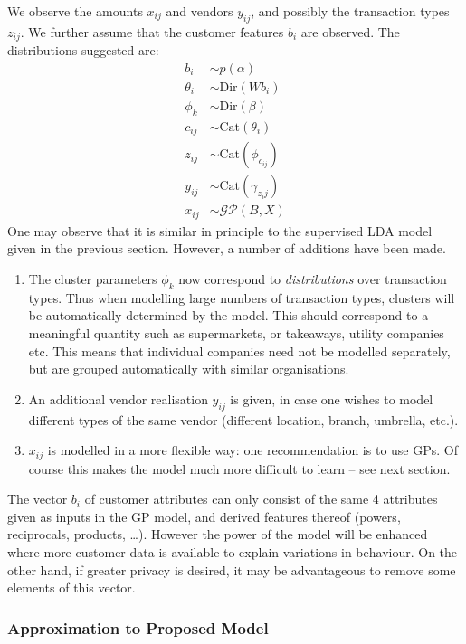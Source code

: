 \documentclass[]{article}
\begin{document}
We observe the amounts \(x_{ij}\) and vendors \(y_{ij}\), and possibly
the transaction types \(z_{ij}\). We further assume that the customer
features \(b_i\) are observed. The distributions suggested are:
\begin{align*}    
b_i &\sim p(\alpha) \\
\theta_i &\sim \text{Dir}(W b_i) \\
\phi_k &\sim \text{Dir}(\beta) \\
c_{ij} &\sim \text{Cat}(\theta_i) \\
z_{ij} &\sim \text{Cat}(\phi_{c_{ij}}) \\
y_{ij} &\sim \text{Cat}(\gamma_{z_ij}) \\
x_{ij} &\sim \mathcal{GP}(B, X)
\end{align*}
One may observe that it is similar in principle to the supervised LDA
model given in the previous section. However, a number of additions have
been made. 
\begin{enumerate}
    \tightlist
    \item The cluster parameters \(\phi_k\) now correspond to
\emph{distributions} over transaction types. Thus when modelling large
numbers of transaction types, clusters will be automatically determined
by the model. This should correspond to a meaningful quantity such as
supermarkets, or takeaways, utility companies etc. This means that
individual companies need not be modelled separately, but are grouped
automatically with similar organisations. 
    \item An additional vendor
realisation \(y_{ij}\) is given, in case one wishes to model different
types of the same vendor (different location, branch, umbrella, etc.).
    \item \(x_{ij}\) is modelled in a more flexible way: one recommendation is
to use GPs. Of course this makes the model much more difficult to learn
-- see next section.
\end{enumerate}

The vector \(b_i\) of customer attributes can only consist of the same 4
attributes given as inputs in the GP model, and derived features thereof
(powers, reciprocals, products, \ldots{}). However the power of the
model will be enhanced where more customer data is available to explain
variations in behaviour. On the other hand, if greater privacy is
desired, it may be advantageous to remove some elements of this vector.

\subsubsection{Approximation to Proposed
Model}\label{approximation-to-proposed-model}
\end{document}

